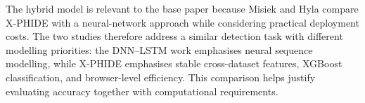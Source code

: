 The hybrid model is relevant to the base paper because Misiek and Hyla compare X-PHIDE with a neural-network approach while considering practical deployment costs. The two studies therefore address a similar detection task with different modelling priorities: the DNN--LSTM work emphasises neural sequence modelling, while X-PHIDE emphasises stable cross-dataset features, XGBoost classification, and browser-level efficiency. This comparison helps justify evaluating accuracy together with computational requirements.\cite{bib1,bib6}
